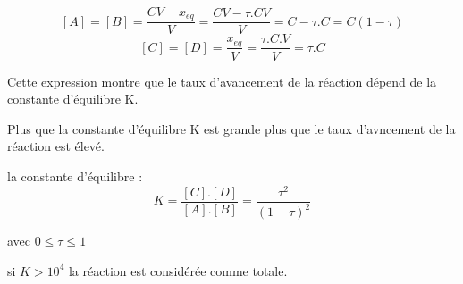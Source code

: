 \documentclass[12pt]{article}
\begin{document}
$$[A] = [B] = \frac{CV-x_{eq}}{V} = \frac{CV-\tau.CV}{V} = C-\tau.C = C(1-\tau)$$
$$[C] = [D] = \frac{x_{eq}}{V} = \frac{\tau.C.V}{V} = \tau.C$$


Cette expression montre que le taux d'avancement de la réaction dépend de la constante d'équilibre K.

Plus que la constante d'équilibre K est grande plus que le taux d'avncement de la réaction est élevé.

la constante d’équilibre : $$K = \frac{[C].[D]}{[A].[B]} = \frac{\tau^2}{(1-\tau)^2}$$

avec $0 \leq \tau \leq 1$ 


si $K>10^4$ la réaction est considérée comme totale.







\end{document}
